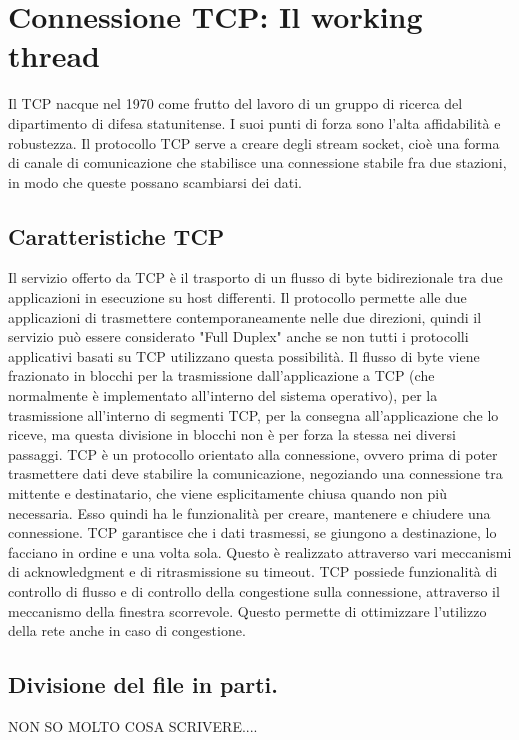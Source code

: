 \chapter{Connessione TCP: Il working thread}
Il TCP nacque nel 1970 come frutto del lavoro di un gruppo di ricerca del dipartimento di difesa statunitense. I suoi punti di forza sono l'alta affidabilità e robustezza.
Il protocollo TCP serve a creare degli stream socket, cioè una forma di canale di comunicazione che stabilisce una connessione stabile fra due stazioni, in modo che queste possano scambiarsi dei dati.

\section{Caratteristiche TCP}
Il servizio offerto da TCP è il trasporto di un flusso di byte bidirezionale tra due applicazioni in esecuzione su host differenti. Il protocollo permette alle due applicazioni di trasmettere contemporaneamente nelle due direzioni, quindi il servizio può essere considerato "Full Duplex" anche se non tutti i protocolli applicativi basati su TCP utilizzano questa possibilità.
Il flusso di byte viene frazionato in blocchi per la trasmissione dall'applicazione a TCP (che normalmente è implementato all'interno del sistema operativo), per la trasmissione all'interno di segmenti TCP, per la consegna all'applicazione che lo riceve, ma questa divisione in blocchi non è per forza la stessa nei diversi passaggi.
TCP è un protocollo orientato alla connessione, ovvero prima di poter trasmettere dati deve stabilire la comunicazione, negoziando una connessione tra mittente e destinatario, che viene esplicitamente chiusa quando non più necessaria. Esso quindi ha le funzionalità per creare, mantenere e chiudere una connessione.
TCP garantisce che i dati trasmessi, se giungono a destinazione, lo facciano in ordine e una volta sola. Questo è realizzato attraverso vari meccanismi di acknowledgment e di ritrasmissione su timeout.
TCP possiede funzionalità di controllo di flusso e di controllo della congestione sulla connessione, attraverso il meccanismo della finestra scorrevole. Questo permette di ottimizzare l'utilizzo della rete anche in caso di congestione.

\section{Divisione del file in parti.}\label{sec:download_tcp}
NON SO MOLTO COSA SCRIVERE.... 